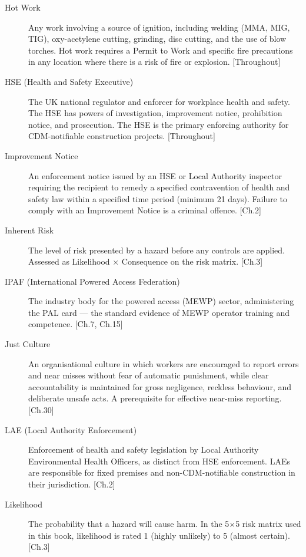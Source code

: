 \begin{description}
\item[Hot Work] Any work involving a source of ignition, including welding (MMA, MIG, TIG), oxy-acetylene cutting, grinding, disc cutting, and the use of blow torches. Hot work requires a Permit to Work and specific fire precautions in any location where there is a risk of fire or explosion. [Throughout]

\item[HSE (Health and Safety Executive)] The UK national regulator and enforcer for workplace health and safety. The HSE has powers of investigation, improvement notice, prohibition notice, and prosecution. The HSE is the primary enforcing authority for CDM-notifiable construction projects. [Throughout]

\item[Improvement Notice] An enforcement notice issued by an HSE or Local Authority inspector requiring the recipient to remedy a specified contravention of health and safety law within a specified time period (minimum 21 days). Failure to comply with an Improvement Notice is a criminal offence. [Ch.2]

\item[Inherent Risk] The level of risk presented by a hazard before any controls are applied. Assessed as Likelihood $\times$ Consequence on the risk matrix. [Ch.3]

\item[IPAF (International Powered Access Federation)] The industry body for the powered access (MEWP) sector, administering the PAL card --- the standard evidence of MEWP operator training and competence. [Ch.7, Ch.15]

\item[Just Culture] An organisational culture in which workers are encouraged to report errors and near misses without fear of automatic punishment, while clear accountability is maintained for gross negligence, reckless behaviour, and deliberate unsafe acts. A prerequisite for effective near-miss reporting. [Ch.30]

\item[LAE (Local Authority Enforcement)] Enforcement of health and safety legislation by Local Authority Environmental Health Officers, as distinct from HSE enforcement. LAEs are responsible for fixed premises and non-CDM-notifiable construction in their jurisdiction. [Ch.2]

\item[Likelihood] The probability that a hazard will cause harm. In the 5$\times$5 risk matrix used in this book, likelihood is rated 1 (highly unlikely) to 5 (almost certain). [Ch.3]


\end{description}
